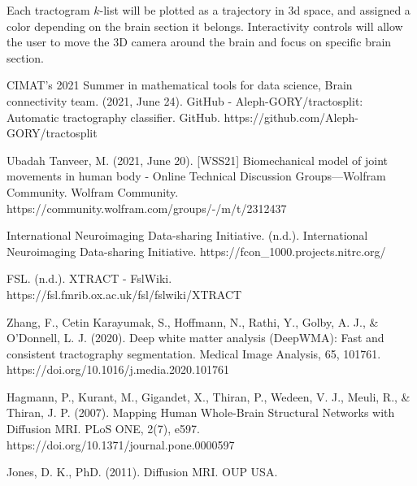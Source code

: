\documentclass[conference]{IEEEtran}
\begin{document}
Each tractogram $k$-list will be plotted as a trajectory in 3d space, and assigned a color depending on the brain section it belongs. Interactivity controls will allow the user to move the 3D camera around the brain and focus on specific brain section.

\newpage
%
%
\begin{thebibliography}{00}
     CIMAT’s 2021 Summer in mathematical tools for data science, Brain connectivity team. (2021, June 24). GitHub - Aleph-GORY/tractosplit: Automatic tractography classifier. GitHub. https://github.com/Aleph-GORY/tractosplit

     Ubadah Tanveer, M. (2021, June 20). [WSS21] Biomechanical model of joint movements in human body - Online Technical Discussion Groups—Wolfram Community. Wolfram Community. https://community.wolfram.com/groups/-/m/t/2312437

     International Neuroimaging Data-sharing Initiative. (n.d.). International Neuroimaging Data-sharing Initiative. https://fcon\_1000.projects.nitrc.org/

     FSL. (n.d.). XTRACT - FslWiki. \\https://fsl.fmrib.ox.ac.uk/fsl/fslwiki/XTRACT

     Zhang, F., Cetin Karayumak, S., Hoffmann, N., Rathi, Y., Golby, A. J., \& O’Donnell, L. J. (2020). Deep white matter analysis (DeepWMA): Fast and consistent tractography segmentation. Medical Image Analysis, 65, 101761. https://doi.org/10.1016/j.media.2020.101761

     Hagmann, P., Kurant, M., Gigandet, X., Thiran, P., Wedeen, V. J., Meuli, R., \& Thiran, J. P. (2007). Mapping Human Whole-Brain Structural Networks with Diffusion MRI. PLoS ONE, 2(7), e597. https://doi.org/10.1371/journal.pone.0000597

     Jones, D. K., PhD. (2011). Diffusion MRI. OUP USA.
\end{thebibliography}
\end{document}
